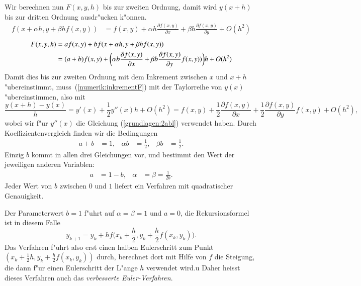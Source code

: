 Wir berechnen nun $F(x,y,h)$ bis zur zweiten Ordnung, damit wird 
$y(x+h)$ bis zur dritten Ordnung ausdr"ucken k"onnen.
\begin{align*}
f(x+\alpha h, y + \beta h f(x,y))
&=
f(x,y)+\alpha h\frac{\partial f(x,y)}{\partial x}
+ \beta h \frac{\partial f(x,y)}{\partial y} + O(h^2)
\end{align*}
\begin{align}
F(x,y,h)
&=
af(x,y) + bf(x+\alpha h, y + \beta h f(x,y))
\notag
\\
&=
(a+b)f(x,y) + \biggl(\alpha b\frac{\partial f(x,y)}{\partial x}
+ \beta b\frac{\partial f(x,y)}{\partial y} f(x,y))\biggr)h+O(h^2)
\label{numerik:inkrementF}
\end{align}
Damit dies bis zur zweiten Ordnung mit dem Inkrement zwischen $x$ und $x+h$
"ubereinstimmt, muss~(\ref{numerik:inkrementF}) mit der Taylorreihe
von $y(x)$ "ubereinstimmen, also mit
\begin{equation}
\frac{y(x+h)-y(x)}{h}=y'(x) + \frac12y''(x)h + O(h^2)
=f(x,y) + \frac12\frac{\partial f(x,y)}{\partial x}
+\frac12\frac{\partial f(x,y)}{\partial y}f(x,y) + O(h^2),
\label{numerik:ytaylor}
\end{equation}
wobei wir f"ur $y''(x)$ die Gleichung (\ref{grundlagen:2abl}) verwendet haben.
Durch Koeffizientenvergleich finden wir die Bedingungen
\[
\begin{aligned}
a+b&=1,&
\alpha b&=\frac12,&
\beta b&=\frac12.
\end{aligned}
\]
Einzig $b$ kommt in allen drei Gleichungen vor, und bestimmt den Wert der
jeweiligen anderen Variablen:
\[
\begin{aligned}
a&=1-b,&\alpha&= \beta=\frac{1}{2b}.
\end{aligned}
\]
Jeder Wert von $b$ zwischen $0$ und $1$ liefert ein Verfahren mit quadratischer
Genauigkeit.

Der Parameterwert $b=1$ f"uhrt auf $\alpha=\beta=1$ und $a=0$, die
Rekursionsformel ist in diesem Falle
\begin{equation}
y_{k+1}=y_{k}+hf\biggl(x_k+\frac{h}2,y_k+\frac{h}2 f(x_k,y_k)\biggr).
\label{numerik:improved-euler}
\end{equation}
Das Verfahren f"uhrt also erst einen halben Eulerschritt zum Punkt
$(x_k+\frac12h,y_k+\frac{h}2f(x_k,y_k))$ durch, berechnet dort mit Hilfe
von $f$ die Steigung, die dann f"ur einen Eulerschritt der L"ange $h$
verwendet wird.u
Daher heisst dieses Verfahren auch das {\em verbesserte Euler-Verfahren}.

